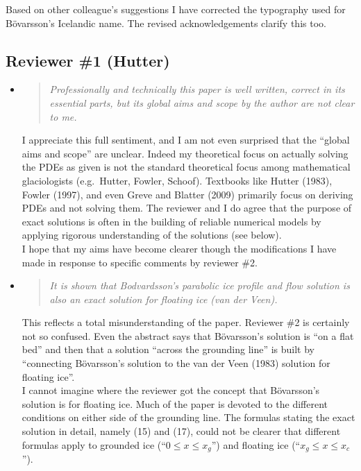 \documentclass[11pt,reqno]{amsart}
\renewcommand{\dh}{\fontencoding{T1}\selectfont{\symbol{240}}}
\newcommand{\bod}{B\"o\dh varsson\xspace}
\newcommand{\reply}[2]{
\medskip\medskip
\item  \begin{quote}
\emph{#1}
\end{quote}

\medskip
\noindent #2}
\begin{document}
\medskip
\noindent Based on other colleague's suggestions I have corrected the typography used for \bod's Icelandic name.  The revised acknowledgements clarify this too.


\subsection*{Reviewer \#1 (Hutter)}  \begin{itemize}
\reply{Professionally and technically this paper is well written, correct in its essential parts, but its global aims and scope by the author are not clear to me.}
{I appreciate this full sentiment, and I am not even surprised that the ``global aims and scope'' are unclear.  Indeed my theoretical focus on actually solving the PDEs as given is not the standard theoretical focus among mathematical glaciologists (e.g.~Hutter, Fowler, Schoof).  Textbooks like Hutter (1983), Fowler (1997), and even Greve and Blatter (2009) primarily focus on deriving PDEs and not solving them.  The reviewer and I do agree that the purpose of exact solutions is often in the building of reliable numerical models by applying rigorous understanding of the solutions (see below). \medskip \\
I hope that my aims have become clearer though the modifications I have made in response to specific comments by reviewer \#2.}

\reply{It is shown that Bodvardsson's parabolic ice profile and flow solution is also an exact solution for floating ice (van der Veen).}
{This reflects a total misunderstanding of the paper.  Reviewer \#2 is certainly not so confused.  Even the abstract says that \bod's solution is ``on a flat bed'' and then that a solution ``across the grounding line'' is built by ``connecting \bod's solution to the van der Veen (1983) solution for floating ice''. \medskip \\
I cannot imagine where the reviewer got the concept that \bod's solution is for floating ice.  Much of the paper is devoted to the different conditions on either side of the grounding line.  The formulas stating the exact solution in detail, namely (15) and (17), could not be clearer that different formulas apply to grounded ice (``$0 \le x \le x_g$'') and floating ice (``$x_g \le x \le x_c$'').}


\end{itemize}
\end{document}
